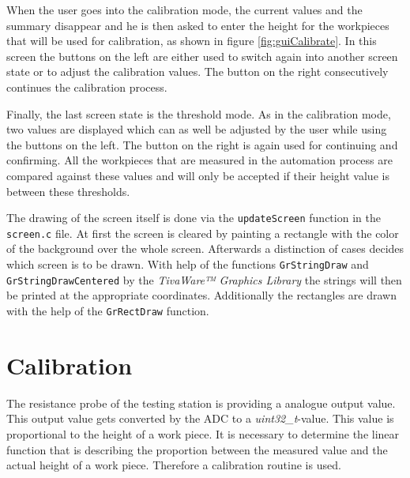 When the user goes into the calibration mode, the current values and the summary disappear and he is then asked to enter the height for the workpieces that will be used for calibration, as shown in figure \ref{fig:guiCalibrate}.
In this screen the buttons on the left are either used to switch again into another screen state or to adjust the calibration values.
The button on the right consecutively continues the calibration process.

Finally, the last screen state is the threshold mode.
As in the calibration mode, two values are displayed which can as well be adjusted by the user while using the buttons on the left.
The button on the right is again used for continuing and confirming.
All the workpieces that are measured in the automation process are compared against these values and will only be accepted if their height value is between these thresholds.

The drawing of the screen itself is done via the \texttt{updateScreen} function in the \texttt{screen.c} file.
At first the screen is cleared by painting a rectangle with the color of the background over the whole screen.
Afterwards a distinction of cases decides which screen is to be drawn.
With help of the functions \texttt{GrStringDraw} and \texttt{GrStringDrawCentered}  by the \textit{TivaWare™ Graphics Library} the strings will then be printed at the appropriate coordinates. 
Additionally the rectangles are drawn with the help of the \texttt{GrRectDraw} function.


\section{Calibration} %



The resistance probe of the testing station is providing a analogue output value. This output value gets converted by the ADC to a \textit{uint32\_t}-value. This value is proportional to the height of a work piece. 
It is necessary to determine the linear function that is describing the proportion between the measured value and the actual height of a work piece. Therefore a calibration routine is used.

